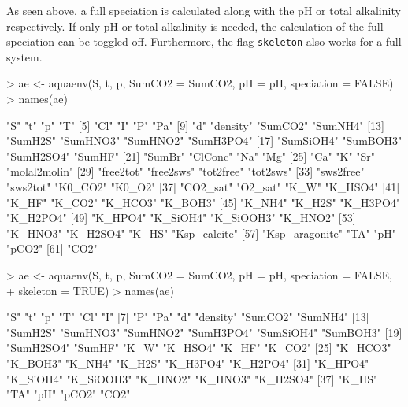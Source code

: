 \documentclass[article,nojss]{jss}
\begin{document}
As seen above, a full speciation is calculated along with the pH or total alkalinity respectively. If only pH or total alkalinity is needed, 
the calculation of the full speciation can be toggled off. Furthermore, the flag \texttt{skeleton} also works for a full system.

\begin{Schunk}
\begin{Sinput}
> ae <- aquaenv(S, t, p, SumCO2 = SumCO2, pH = pH, speciation = FALSE)
> names(ae)
\end{Sinput}
\begin{Soutput}
 [1] "S"             "t"             "p"             "T"            
 [5] "Cl"            "I"             "P"             "Pa"           
 [9] "d"             "density"       "SumCO2"        "SumNH4"       
[13] "SumH2S"        "SumHNO3"       "SumHNO2"       "SumH3PO4"     
[17] "SumSiOH4"      "SumBOH3"       "SumH2SO4"      "SumHF"        
[21] "SumBr"         "ClConc"        "Na"            "Mg"           
[25] "Ca"            "K"             "Sr"            "molal2molin"  
[29] "free2tot"      "free2sws"      "tot2free"      "tot2sws"      
[33] "sws2free"      "sws2tot"       "K0_CO2"        "K0_O2"        
[37] "CO2_sat"       "O2_sat"        "K_W"           "K_HSO4"       
[41] "K_HF"          "K_CO2"         "K_HCO3"        "K_BOH3"       
[45] "K_NH4"         "K_H2S"         "K_H3PO4"       "K_H2PO4"      
[49] "K_HPO4"        "K_SiOH4"       "K_SiOOH3"      "K_HNO2"       
[53] "K_HNO3"        "K_H2SO4"       "K_HS"          "Ksp_calcite"  
[57] "Ksp_aragonite" "TA"            "pH"            "pCO2"         
[61] "CO2"          
\end{Soutput}
\begin{Sinput}
> ae <- aquaenv(S, t, p, SumCO2 = SumCO2, pH = pH, speciation = FALSE, 
+     skeleton = TRUE)
> names(ae)
\end{Sinput}
\begin{Soutput}
 [1] "S"        "t"        "p"        "T"        "Cl"       "I"       
 [7] "P"        "Pa"       "d"        "density"  "SumCO2"   "SumNH4"  
[13] "SumH2S"   "SumHNO3"  "SumHNO2"  "SumH3PO4" "SumSiOH4" "SumBOH3" 
[19] "SumH2SO4" "SumHF"    "K_W"      "K_HSO4"   "K_HF"     "K_CO2"   
[25] "K_HCO3"   "K_BOH3"   "K_NH4"    "K_H2S"    "K_H3PO4"  "K_H2PO4" 
[31] "K_HPO4"   "K_SiOH4"  "K_SiOOH3" "K_HNO2"   "K_HNO3"   "K_H2SO4" 
[37] "K_HS"     "TA"       "pH"       "pCO2"     "CO2"     
\end{Soutput}
\end{Schunk}
\end{document}
